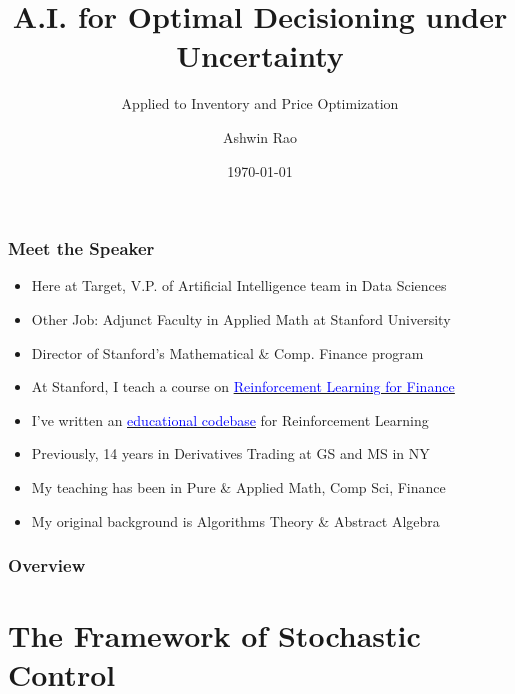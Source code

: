 \documentclass[handout]{beamer}
\title[A.I. For Retail]{A.I. for Optimal Decisioning under Uncertainty} %
\subtitle{Applied to Inventory and Price Optimization}
\author{Ashwin Rao} %
\institute[Target/Stanford] %
{V.P. Artificial Intelligence at Target \& Adjunct Faculty at Stanford
}
\date{\today} %
\begin{document}
\begin{frame}
\titlepage %
\end{frame}

\begin{frame}
\frametitle{Meet the Speaker}
\pause
\begin{itemize}[<+->]
\item Here at Target, V.P. of Artificial Intelligence team in Data Sciences
\item Other Job: Adjunct Faculty in Applied Math at Stanford University
\item Director of Stanford's Mathematical \& Comp. Finance program
\item At Stanford, I teach a course on \href{https://github.com/coverdrive/technical-documents/blob/master/finance/cme241/Stanford-CME241.pdf}{\underline{\textcolor{blue}{Reinforcement Learning for Finance}}}
\item I've written an \href{https://github.com/coverdrive/MDP-DP-RL}{\underline{\textcolor{blue}{educational codebase}}} for Reinforcement Learning
\item Previously, 14 years in Derivatives Trading at GS and MS in NY
\item My teaching has been in Pure \& Applied Math, Comp Sci, Finance
\item My original background is Algorithms Theory \& Abstract Algebra
\end{itemize}
\end{frame}

\begin{frame}
\frametitle{Overview} %
\tableofcontents %
\end{frame}

\section{The Framework of Stochastic Control}
\end{document}
